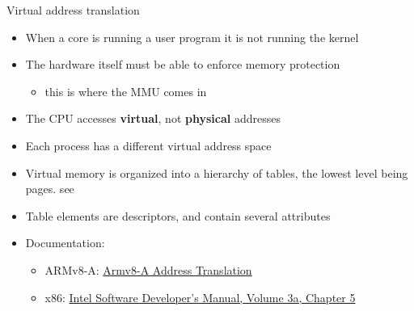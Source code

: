 \begin{frame}{Virtual address translation}
  \begin{itemize}
    \item When a core is running a user program it is not running the kernel
    \item The hardware itself must be able to enforce memory protection
    \begin{itemize}
      \item this is where the MMU comes in
    \end{itemize}
    \item The CPU accesses \textbf{virtual}, not \textbf{physical} addresses
    \item Each process has a different virtual address space
    \item Virtual memory is organized into a hierarchy of tables, the lowest level being pages.
          see 
    \item Table elements are descriptors, and contain several attributes
    \item Documentation:
    \begin{itemize}
      \item ARMv8-A: \href{https://developer.arm.com/documentation/100940/0101/}{Armv8-A Address Translation}
      \item x86: \href{https://www.intel.com/content/www/us/en/developer/articles/technical/intel-sdm.html}{Intel Software Developer's Manual, Volume 3a, Chapter 5}
    \end{itemize}
  \end{itemize}
\end{frame}

